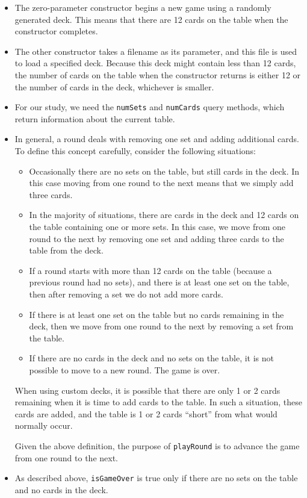 \documentclass[11pt]{article}
\begin{document}
\begin{itemize}
\item The zero-parameter constructor begins a new game using a randomly
  generated deck.  This means that there are 12 cards on the table when the
  constructor completes.

\item The other constructor takes a filename as its parameter, and this file is
  used to load a specified deck.  Because this deck might contain less than 12
  cards, the number of cards on the table when the constructor returns is
  either 12 or the number of cards in the deck, whichever is smaller.

\item For our study, we need the {\tt numSets} and {\tt numCards} query
  methods, which return information about the current table.

\item In general, a round deals with removing one set and adding additional
  cards.  To define this concept carefully, consider the following situations:

\begin{itemize}
\item Occasionally there are no sets on the table, but still cards in the deck.
  In this case moving from one round to the next means that we simply add three
  cards.
\item In the majority of situations, there are cards in the deck and 12 cards
  on the table containing one or more sets.  In this case, we move from one
  round to the next by removing one set and adding three cards to the table
  from the deck.
\item If a round starts with more than 12 cards on the table (because a
  previous round had no sets), and there is at least one set on the table, then
  after removing a set we do not add more cards.
\item If there is at least one set on the table but no cards remaining in the
  deck, then we move from one round to the next by removing a set from the
  table.
\item If there are no cards in the deck and no sets on the table, it is not
  possible to move to a new round.  The game is over.
\end{itemize}

When using custom decks, it is possible that there are only 1 or 2 cards
remaining when it is time to add cards to the table.  In such a situation,
these cards are added, and the table is 1 or 2 cards ``short'' from what would
normally occur.

Given the above definition, the purpose of {\tt playRound} is to advance the
game from one round to the next.

\item As described above, {\tt isGameOver} is true only if there are no sets on
  the table and no cards in the deck.
\end{itemize}
\end{document}
